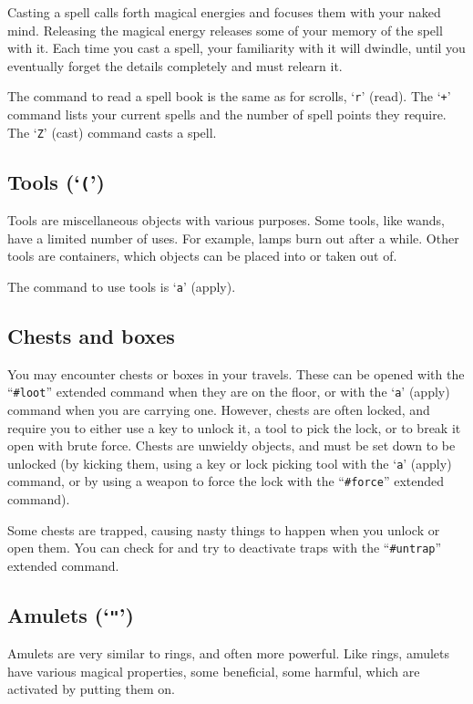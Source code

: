 Casting a spell calls forth magical energies and focuses them with
your naked mind.  Releasing the magical energy releases some of your
memory of the spell with it.  Each time you cast a spell, your
familiarity with it will dwindle, until you eventually forget the
details completely and must relearn it.

The command to read a spell book is the same as for scrolls, `{\tt r}'
(read).  The `{\tt +}' command lists your current spells and the number of
spell points they require.  The `{\tt Z}' (cast) command casts a spell.

\subsection*{Tools (`{\tt (}')}

Tools are miscellaneous objects with various purposes.  Some tools,
like wands, have a limited number of uses.  For example, lamps burn
out after a while.  Other tools are containers, which objects can
be placed into or taken out of.

The command to use tools is `{\tt a}' (apply).

\subsection*{Chests and boxes}

You may encounter chests or boxes in your travels.  These can be
opened with the ``{\tt \#loot}'' extended command when they are on the floor,
or with the `{\tt a}' (apply) command when you are carrying one.  However,
chests are often locked, and require you to either use a key to unlock
it, a tool to pick the lock, or to break it open with brute force.
Chests are unwieldy objects, and must be set down to be unlocked (by
kicking them, using a key or lock picking tool with the `{\tt a}' (apply)
command, or by using a weapon to force the lock with the ``{\tt \#force}''
extended command).

Some chests are trapped, causing nasty things to happen when you
unlock or open them.  You can check for and try to deactivate traps
with the ``{\tt \#untrap}'' extended command.

\subsection*{Amulets (`{\tt "}')}

Amulets are very similar to rings, and often more powerful.  Like
rings, amulets have various magical properties, some beneficial,
some harmful, which are activated by putting them on.

